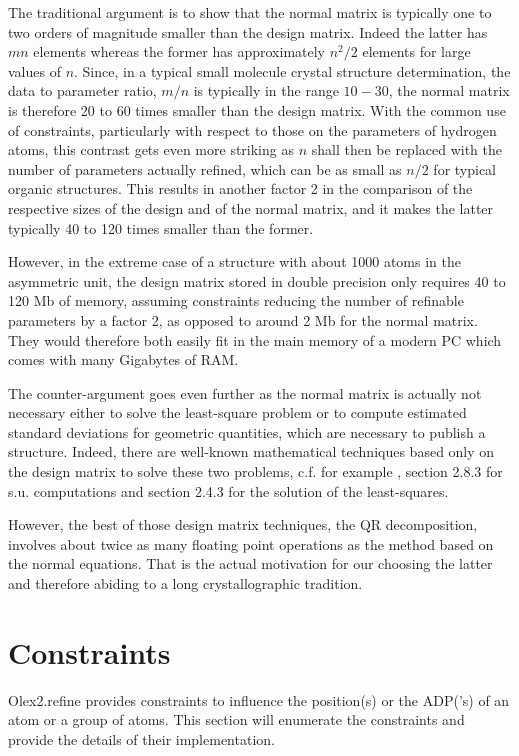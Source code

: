 \documentclass[pdf]{iucr}
\begin{document}
The traditional argument is to show that the normal matrix is typically one to two orders of magnitude smaller than the design matrix. Indeed the latter has $m n$ elements whereas the former has approximately $n^2/2$ elements for large values of $n$. Since, in a typical small molecule crystal structure determination, the data to parameter ratio, $m / n$ is typically in the range $10-30$, the normal matrix is therefore 20 to 60 times smaller than the design matrix. With the common use of constraints, particularly with respect to those on the parameters of hydrogen atoms, this contrast gets even more striking as $n$ shall then be replaced with the number of parameters actually refined, which can be as small as $n/2$ for typical organic structures. This results in another factor 2 in the comparison of the respective sizes of the design and of the normal matrix, and it makes the latter typically 40 to 120 times smaller than the former. 

However, in the extreme case of a structure with about 1000 atoms in the asymmetric unit, the design matrix stored in double precision only requires 40 to 120 Mb of memory, assuming constraints reducing the number of refinable parameters by a factor 2, as opposed to around 2 Mb for the normal matrix. They would therefore both easily fit in the main memory of a modern PC which comes with many Gigabytes of RAM.

The counter-argument goes even further as the normal matrix is actually not necessary either to solve the least-square problem or to compute estimated standard deviations for geometric quantities, which are necessary to publish a structure. Indeed, there are well-known mathematical techniques based only on the design matrix to solve these two problems, c.f. for example \cite{Bjorck:1996fk}, section 2.8.3 for s.u. computations and section 2.4.3 for the solution of the least-squares.
 
However, the best of those design matrix techniques, the QR decomposition, involves about twice as many floating point operations as the method based on the normal equations. That is the actual motivation for our choosing the latter and therefore abiding to a long crystallographic tradition.


\section{Constraints}
\label{appendix:constraints}
Olex2.refine provides constraints to influence the position(s) or the ADP('s) of an atom or a group of atoms. This section will enumerate the constraints and provide the details of their implementation.
\end{document}
